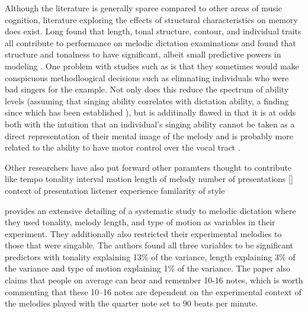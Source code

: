 \documentclass[]{book}
\begin{document}
Although the literature is generally sparce compared to other areas of music cognition, literature exploring the effects of structural characteristics on memory does exist.
Long found that length, tonal structure, contour, and individual traits all contribute to performance on melodic dictation examinations and found that structure and tonalness to have significant, albeit small predictive powers in modeling \citep{longRelationshipsPitchMemory1977}.
One problem with studies such as \citep{longRelationshipsPitchMemory1977} is that they sometimes would make conspicuous methodloogical decisions such as elimnating individuals who were bad singers for the example.
Not only does this reduce the spectrum of ability levels (assuming that singing ability correlates with dictation ability, a finding since which has been established \citep{norrisRelationshipSightSinging2003}), but is additinally flawed in that it is at odds both with the intuition that an individual's singing ability cannot be taken as a direct representation of their mental image of the melody and is probably more related to the ability to have motor control over the vocal tract \citep{pfordresherPoorPitchSingingAbsence2007}.

Other researchers have also put forward other paramters thought to contribute like tempo \citep{hofstetterComputerBaesedRecognitionPerceptual1981}
tonality \citep{dowlingScaleContourTwo1978} \citep{longRelationshipsPitchMemory1977} \citep{pembrookInterferenceTranscriptionProcess1986} \citep{ouraMemoryMelodiesSubjects1988}
interval motion \citep{ortmannTonalDeterminantsMelodic1933, pembrookInterferenceTranscriptionProcess1986}
length of melody \citep{longRelationshipsPitchMemory1977, pembrookInterferenceTranscriptionProcess1986}
number of presentations \citep{hofstetterComputerBaesedRecognitionPerceptual1981} {[}\citep{pembrookInterferenceTranscriptionProcess1986}{]}
context of presentation \citep{schellenbergEffectTonalRhythmicContext1985}
listener experience \citep{longRelationshipsPitchMemory1977, ouraMemoryMelodiesSubjects1988} \citep{schellenbergEffectTonalRhythmicContext1985, taylorStrategiesMemoryShort1983}
familarity of style \citep{schellenbergEffectTonalRhythmicContext1985}

\citet{pembrookInterferenceTranscriptionProcess1986} provides an extensive detailing of a systematic study to melodic dictation where they used tonality, melody length, and type of motion as variables in their experiment.
They additionally also restricted their experimental melodies to those that were singable.
The authors found all three variables to be significant predictors with tonality explaining 13\% of the variance, length explaining 3\% of the variance and type of motion explaining 1\% of the variance.
The paper also claims that people on average can hear and remember 10-16 notes, which is worth commenting that these 10--16 notes are dependent on the experimental context of the melodies played with the quarter note set to 90 beats per minute.
\end{document}
